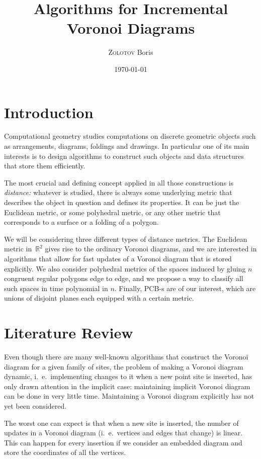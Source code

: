 \documentclass[a4paper,11pt]{article}
\title{Algorithms for Incremental Voronoi Diagrams}
\author{{\scshape Zolotov} Boris}
\date{\today}
\begin{document}
 \maketitle

\section{Introduction}

Computational geometry studies computations on discrete geometric objects such as arrangements, diagrams, foldings and drawings. In particular one of its main interests is to design algorithms to construct such objects and data structures that store them efficiently.

The most crucial and defining concept applied in all those constructions is {\itshape distance:} whatever is studied, there is always some underlying metric that describes the object in question and defines its properties. It can be just the Euclidean metric, or some polyhedral metric, or any other metric that corresponds to a surface or a folding of a polygon.

We will be considering three different types of distance metrics. The Euclidean metric in~$\mathbb{R}^2$ gives rise to the ordinary Voronoi diagrams, and we are interested in algorithms that allow for fast updates of a Voronoi diagram that is stored explicitly. We also consider polyhedral metrics of the spaces induced by gluing $n$ congruent regular polygons edge to edge, and we propose a way to classify all such spaces in time polynomial in $n$. Finally, PCB-s are of our interest, which are unions of disjoint planes each equipped with a certain metric.

\section{Literature Review}

Even though there are many well-known algorithms that construct the Voronoi diagram for a given family of sites, the problem of making a Voronoi diagram dynamic, i.~e.~implementing changes to it when a new point site is inserted, has only drawn attention in the implicit case: maintaining implicit Voronoi diagram can be done in very little time. Maintaining a Voronoi diagram explicitly has not yet been considered.

The worst one can expect is that when a new site is inserted, the number of updates in a Voronoi diagram (i.~e.~vertices and edges that change) is linear. This can happen for every insertion if we consider an embedded diagram and store the coordinates of all the vertices.
\end{document}
